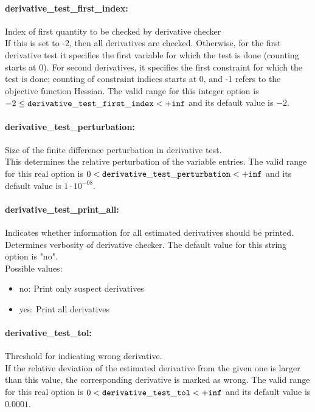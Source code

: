 \paragraph{derivative\_test\_first\_index:}\label{sec:derivative_test_first_index} Index of first quantity to be checked by derivative checker $\;$ \\
 If this is set to -2, then all derivatives are
checked.  Otherwise, for the first derivative
test it specifies the first variable for which
the test is done (counting starts at 0).  For
second derivatives, it specifies the first
constraint for which the test is done; counting
of constraint indices starts at 0, and -1 refers
to the objective function Hessian. The valid range for this integer option is
$-2 \le {\tt derivative\_test\_first\_index } <  {\tt +inf}$
and its default value is $-2$.


\paragraph{derivative\_test\_perturbation:}\label{sec:derivative_test_perturbation} Size of the finite difference perturbation in derivative test. $\;$ \\
 This determines the relative perturbation of the
variable entries. The valid range for this real option is 
$0 <  {\tt derivative\_test\_perturbation } <  {\tt +inf}$
and its default value is $1 \cdot 10^{-08}$.


\paragraph{derivative\_test\_print\_all:}\label{sec:derivative_test_print_all} Indicates whether information for all estimated derivatives should be printed. $\;$ \\
 Determines verbosity of derivative checker.
The default value for this string option is "no".
\\ 
Possible values:
\begin{itemize}
   \item no: Print only suspect derivatives
   \item yes: Print all derivatives
\end{itemize}

\paragraph{derivative\_test\_tol:}\label{sec:derivative_test_tol} Threshold for indicating wrong derivative. $\;$ \\
 If the relative deviation of the estimated
derivative from the given one is larger than this
value, the corresponding derivative is marked as
wrong. The valid range for this real option is 
$0 <  {\tt derivative\_test\_tol } <  {\tt +inf}$
and its default value is $0.0001$.


